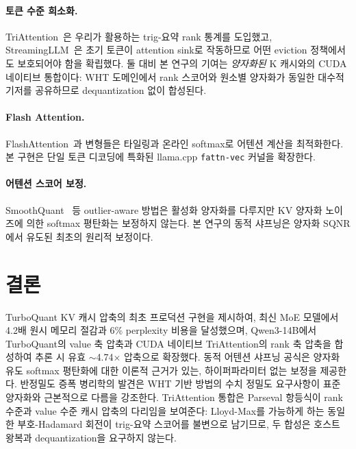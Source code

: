 \documentclass[10pt,twocolumn]{article}
\begin{document}
\paragraph{토큰 수준 희소화.} TriAttention~\cite{triattention2026}은 우리가 활용하는 trig-요약 rank 통계를 도입했고, StreamingLLM~\cite{streamingllm2023}은 초기 토큰이 attention sink로 작동하므로 어떤 eviction 정책에서도 보호되어야 함을 확립했다. 둘 대비 본 연구의 기여는 \emph{양자화된} K 캐시와의 CUDA 네이티브 통합이다: WHT 도메인에서 rank 스코어와 원소별 양자화가 동일한 대수적 기저를 공유하므로 dequantization 없이 합성된다.

\paragraph{Flash Attention.} FlashAttention~\cite{dao2022flashattention,dao2023flashattention2}과 변형들은 타일링과 온라인 softmax로 어텐션 계산을 최적화한다. 본 구현은 단일 토큰 디코딩에 특화된 llama.cpp \texttt{fattn-vec} 커널을 확장한다.

\paragraph{어텐션 스코어 보정.} SmoothQuant~\cite{smoothquant2023} 등 outlier-aware 방법은 활성화 양자화를 다루지만 KV 양자화 노이즈에 의한 softmax 평탄화는 보정하지 않는다. 본 연구의 동적 샤프닝은 양자화 SQNR에서 유도된 최초의 원리적 보정이다.

\section{결론}
\label{sec:conclusion}

TurboQuant KV 캐시 압축의 최초 프로덕션 구현을 제시하여, 최신 MoE 모델에서 4.2배 원시 메모리 절감과 6\% perplexity 비용을 달성했으며, Qwen3-14B에서 TurboQuant의 value 축 압축과 CUDA 네이티브 TriAttention의 rank 축 압축을 합성하여 추론 시 유효 $\sim$4.74$\times$ 압축으로 확장했다. 동적 어텐션 샤프닝 공식은 양자화 유도 softmax 평탄화에 대한 이론적 근거가 있는, 하이퍼파라미터 없는 보정을 제공한다. 반정밀도 증폭 병리학의 발견은 WHT 기반 방법의 수치 정밀도 요구사항이 표준 양자화와 근본적으로 다름을 강조한다. TriAttention 통합은 Parseval 항등식이 rank 수준과 value 수준 캐시 압축의 다리임을 보여준다: Lloyd-Max를 가능하게 하는 동일한 부호-Hadamard 회전이 trig-요약 스코어를 불변으로 남기므로, 두 합성은 호스트 왕복과 dequantization을 요구하지 않는다.
\end{document}
